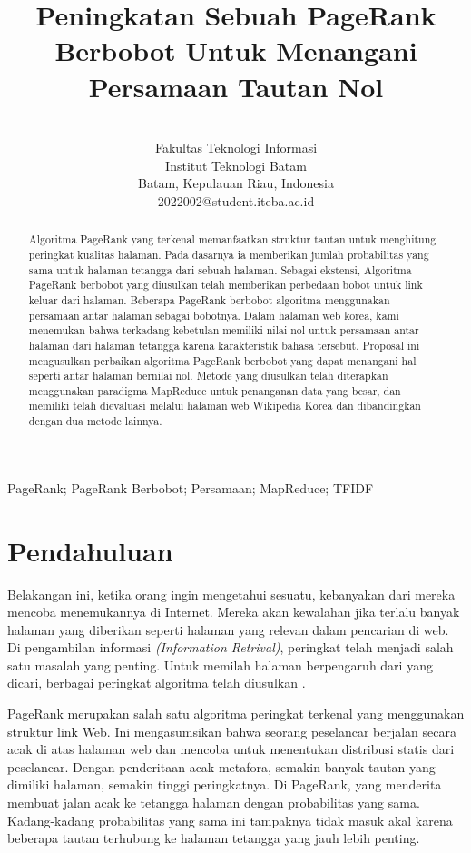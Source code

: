 \documentclass[conference]{IEEEtran}
\title{\textbf{Peningkatan Sebuah PageRank Berbobot Untuk Menangani Persamaan Tautan Nol}}
\author{\IEEEauthorblockN{Jeremy Andika}\\
Fakultas Teknologi Informasi\\
Institut Teknologi Batam\\
Batam, Kepulauan Riau, Indonesia\\
2022002@student.iteba.ac.id}
\begin{document}
\maketitle

\begin{abstract}

    Algoritma PageRank yang terkenal memanfaatkan
struktur tautan untuk menghitung peringkat kualitas halaman. Pada dasarnya ia memberikan jumlah probabilitas yang sama untuk halaman tetangga dari sebuah halaman. Sebagai ekstensi, Algoritma PageRank berbobot yang diusulkan telah memberikan perbedaan bobot untuk link keluar dari halaman. Beberapa PageRank berbobot algoritma menggunakan persamaan antar halaman sebagai bobotnya. Dalam halaman web korea, kami menemukan bahwa terkadang kebetulan memiliki nilai nol untuk persamaan antar halaman dari halaman tetangga karena karakteristik bahasa tersebut. Proposal ini mengusulkan perbaikan algoritma PageRank berbobot yang dapat menangani hal seperti antar halaman bernilai nol. Metode yang diusulkan telah diterapkan menggunakan paradigma MapReduce untuk penanganan data yang besar, dan memiliki telah dievaluasi melalui halaman web Wikipedia Korea dan dibandingkan dengan dua metode lainnya.
\end{abstract}

\begin{IEEEkeywords}
    PageRank; PageRank Berbobot; Persamaan; MapReduce; TFIDF
\end{IEEEkeywords}

\section{Pendahuluan}

Belakangan ini, ketika orang ingin mengetahui sesuatu, kebanyakan dari mereka mencoba menemukannya di Internet. Mereka akan kewalahan jika terlalu banyak halaman yang diberikan seperti halaman yang relevan dalam pencarian di web. Di pengambilan informasi \textit{(Information Retrival)}, peringkat telah menjadi salah satu masalah yang penting. Untuk memilah halaman berpengaruh dari yang dicari, berbagai peringkat algoritma telah diusulkan \cite{brin1998anatomy, xing2004weighted, qiao2010simrank, page1999pagerank, kumar2013pagerank, duhan2009page, najork2007comparing, kumar2011page, nemirovsky2008weighted, tyagi2012weighted, haveliwala2003topic}.

PageRank\cite{brin1998anatomy} merupakan salah satu algoritma peringkat terkenal yang menggunakan struktur link Web. Ini mengasumsikan bahwa seorang peselancar berjalan secara acak di atas halaman web dan mencoba untuk menentukan distribusi statis dari peselancar. Dengan penderitaan acak metafora, semakin banyak tautan yang dimiliki halaman, semakin tinggi peringkatnya. Di PageRank, yang menderita membuat jalan acak ke tetangga halaman dengan probabilitas yang sama. Kadang-kadang probabilitas yang sama ini tampaknya tidak masuk akal karena beberapa tautan terhubung ke halaman tetangga yang jauh lebih penting.
\end{document}

